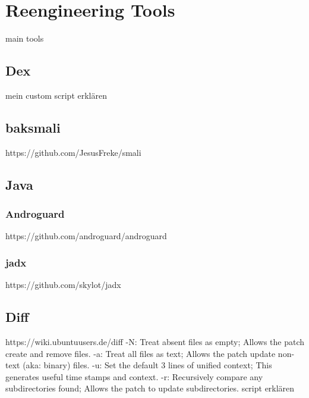 \section{Reengineering Tools}\label{section:tools}
main tools
\subsection{Dex}\label{subsection:tools-dex}
mein custom script erklären

\subsection{baksmali}\label{subsection:tools-baksmali}
https://github.com/JesusFreke/smali

\subsection{Java}\label{subsection:tools-java}
\subsubsection{Androguard}\label{subsection:tools-java-androguard}
https://github.com/androguard/androguard
\subsubsection{jadx}\label{subsection:tools-java-jadx}
https://github.com/skylot/jadx


\subsection{Diff}\label{subsection:tools-diff}
https://wiki.ubuntuusers.de/diff\newline
-N: Treat absent files as empty; Allows the patch create and remove files.\newline
-a: Treat all files as text; Allows the patch update non-text (aka: binary) files.\newline
-u: Set the default 3 lines of unified context; This generates useful time stamps and context.\newline
-r: Recursively compare any subdirectories found; Allows the patch to update subdirectories.\newline
script erklären
